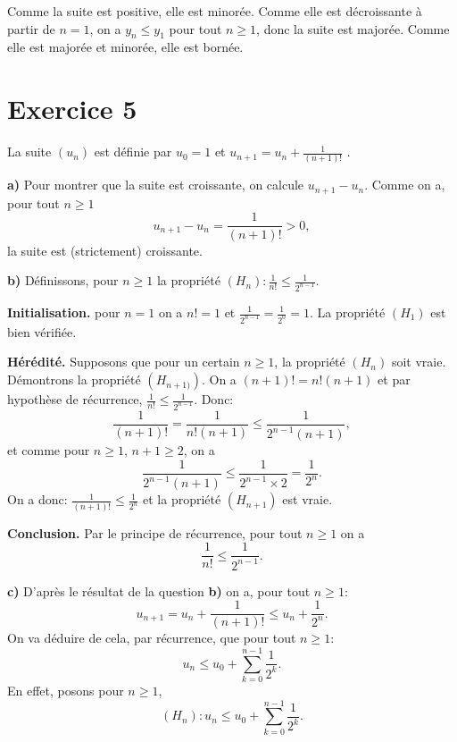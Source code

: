 \documentclass[12pt, a4paper,oneside]{article} %
\begin{document}
Comme la suite est positive, elle est minorée.
Comme elle est décroissante à partir de $ n=1 $,
on a $ y_{n} \le y_{1} $ pour tout $ n \ge 1 $,
donc la suite est majorée.
Comme elle est majorée et minorée, elle est bornée.

\section{Exercice 5}

La suite $ (u_{n})  $ 
est définie par
$ u_{0} = 1 $ 
et
$ u_{n+1} = u_{n} + \frac{1}{(n+1)!} $ 
.

\textbf{a)}
Pour montrer que la suite
est croissante,
on calcule
$ u_{n+1} - u_{n} $.
Comme on a,
pour tout $ n \ge 1 $
\begin{equation}
	u_{n+1} - u_{n}
	=
	\frac{1}{(n+1)!}
	> 0
	,
\end{equation}
la suite est (strictement) croissante.

\textbf{b)}
Définissons,
pour $ n \ge 1 $
la propriété
$ (H_{n}): \frac{1}{n!} \le \frac{1}{2^{n-1} } $.

\textbf{Initialisation.}
pour $ n=1 $ on a
$ n! = 1 $ et
$ \frac{1}{2^{n-1} } = \frac{1}{2^{0} } = 1 $.
La propriété $ (H_{1}) $ est bien vérifiée.

\textbf{Hérédité.}
Supposons que pour un certain
$ n \ge 1 $, 
la propriété $ (H_{n}) $
soit vraie.
Démontrons la propriété
$ (H_{n+1)}) $.
On a
$ (n+1)! = n!  (n+1) $
et par hypothèse de
récurrence,
$ \frac{1}{n!} \le \frac{1}{2^{n-1} } $.
Donc:
\begin{equation}
	\frac{1}{(n+1)!}
	=
	\frac{1}{n! (n+1)}
	\le
	\frac{1}{2^{n-1} (n+1)}
	,
\end{equation}
et comme pour $ n \ge 1 $,
$ n+1 \ge 2 $, on a
\begin{equation}
	\frac{1}{2^{n-1} (n+1)}
	\le
	\frac{1}{2^{n-1} \times 2}
	=
	\frac{1}{2^{n} }
	.
\end{equation}
On a donc: $ \frac{1}{(n+1)!} \le \frac{1}{2^{n} } $
et la propriété $ (H_{n+1}) $ est vraie.

\textbf{Conclusion.}
Par le principe de récurrence,
pour tout $ n \ge 1 $ on a
\begin{equation}
	\frac{1}{n!}
	\le
	\frac{1}{2^{n-1} }
	.
\end{equation}

\textbf{c)}
D'après le résultat
de la question \textbf{b)}
on a, pour tout $ n \ge 1 $:
\begin{equation}
	u_{n+1}
	=
	u_{n} 
	+
	\frac{1}{(n+1)!}
	\le
	u_{n}
	+
	\frac{1}{2^{n} }
	.
\end{equation}
On va déduire
de cela,
par récurrence,
que pour tout $ n \ge 1 $:
\begin{equation}
	u_{n}
	\le
	u_{0}
	+
	\sum_{k=0}^{n-1} 
	\frac{1}{2^{k} }
	.
\end{equation}
En effet, posons
pour $ n \ge 1 $,
\begin{equation}
	(H_{n}):
	u_{n}
	\le
	u_{0}
	+
	\sum_{k=0}^{n-1} 
	\frac{1}{2^{k} }
	.
\end{equation}
\end{document}
